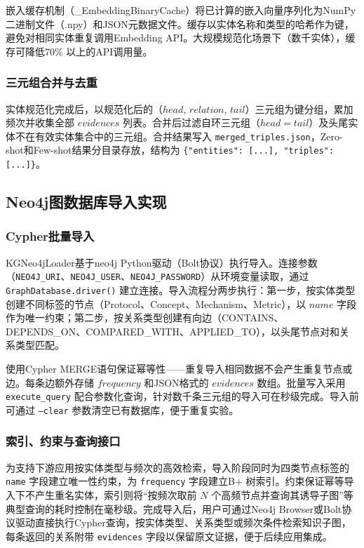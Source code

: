 嵌入缓存机制（\_EmbeddingBinaryCache）将已计算的嵌入向量序列化为NumPy二进制文件（.npy）和JSON元数据文件。缓存以实体名称和类型的哈希作为键，避免对相同实体重复调用Embedding API。大规模规范化场景下（数千实体），缓存可降低70\% 以上的API调用量。

\subsubsection{三元组合并与去重}

实体规范化完成后，以规范化后的（$head$, $relation$, $tail$）三元组为键分组，累加频次并收集全部 $evidences$ 列表。合并后过滤自环三元组（$head = tail$）及头尾实体不在有效实体集合中的三元组。合并结果写入 \texttt{merged\_triples.json}，Zero-shot和Few-shot结果分目录存放，结构为 \texttt{\{"entities": [...], "triples": [...]\}}。

\subsection{Neo4j图数据库导入实现}

\subsubsection{Cypher批量导入}

KGNeo4jLoader基于neo4j Python驱动（Bolt协议）执行导入。连接参数（\texttt{NEO4J\_URI}、\texttt{NEO4J\_USER}、\texttt{NEO4J\_PASSWORD}）从环境变量读取，通过 \texttt{GraphDatabase.driver()} 建立连接。导入流程分两步执行：第一步，按实体类型创建不同标签的节点（Protocol、Concept、Mechanism、Metric），以 $name$ 字段作为唯一约束；第二步，按关系类型创建有向边（CONTAINS、DEPENDS\_ON、COMPARED\_WITH、APPLIED\_TO），以头尾节点对和关系类型匹配。

使用Cypher MERGE语句保证幂等性——重复导入相同数据不会产生重复节点或边。每条边额外存储 $frequency$ 和JSON格式的 $evidences$ 数组。批量写入采用 \texttt{execute\_query} 配合参数化查询，针对数千条三元组的导入可在秒级完成。导入前可通过 \texttt{--clear} 参数清空已有数据库，便于重复实验。

\subsubsection{索引、约束与查询接口}

为支持下游应用按实体类型与频次的高效检索，导入阶段同时为四类节点标签的 \texttt{name} 字段建立唯一性约束，为 \texttt{frequency} 字段建立B+ 树索引。约束保证幂等导入下不产生重名实体，索引则将“按频次取前 $N$ 个高频节点并查询其诱导子图”等典型查询的耗时控制在毫秒级。完成导入后，用户可通过Neo4j Browser或Bolt协议驱动直接执行Cypher查询，按实体类型、关系类型或频次条件检索知识子图，每条返回的关系附带 \texttt{evidences} 字段以保留原文证据，便于后续应用集成。

